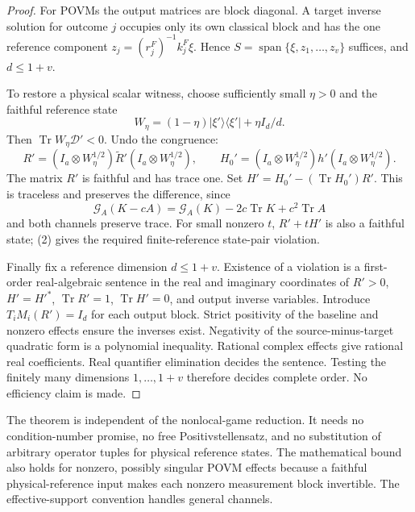 \documentclass[11pt]{article}
\newcommand{\Tr}{\operatorname{Tr}}
\begin{document}
\begin{proof}
For POVMs the output matrices are block diagonal. A target inverse solution for
outcome $j$ occupies only its own classical block and has the one reference
component $z_j=(r_j^F)^{-1}k_j^F\xi$. Hence
$S=\operatorname{span}\{\xi,z_1,\ldots,z_v\}$ suffices, and $d\le1+v$.

To restore a physical scalar witness, choose sufficiently small $\eta>0$ and
the faithful reference state
\[
 W_\eta=(1-\eta)|\xi'\rangle\langle\xi'|+\eta I_d/d.
\]
Then $\Tr W_\eta\mathcal D'<0$. Undo the congruence:
\[
 R'=(I_a\otimes W_\eta^{1/2})\widetilde R'(I_a\otimes W_\eta^{1/2}),\qquad
 H_0'=(I_a\otimes W_\eta^{1/2})h'(I_a\otimes W_\eta^{1/2}).
\]
The matrix $R'$ is faithful and has trace one. Set
$H'=H_0'-(\Tr H_0')R'$. This is traceless and preserves the difference, since
\[
 \mathcal G_A(K-cA)=\mathcal G_A(K)-2c\Tr K+c^2\Tr A
\]
and both channels preserve trace. For small nonzero $t$, $R'+tH'$ is also a
faithful state; (2) gives the required finite-reference state-pair violation.

Finally fix a reference dimension $d\le1+v$. Existence of a violation is a
first-order real-algebraic sentence in the real and imaginary coordinates of
$R'>0$, $H'=H'^*$, $\Tr R'=1$, $\Tr H'=0$, and output inverse variables.
Introduce $T_iM_i(R')=I_d$ for each output block. Strict positivity of the
baseline and nonzero effects ensure the inverses exist. Negativity of the
source-minus-target quadratic form is a polynomial inequality. Rational
complex effects give rational real coefficients. Real quantifier elimination
decides the sentence. Testing the finitely many dimensions $1,\ldots,1+v$
therefore decides complete order. No efficiency claim is made.
\end{proof}

The theorem is independent of the nonlocal-game reduction. It needs no
condition-number promise, no free Positivstellensatz, and no substitution of
arbitrary operator tuples for physical reference states. The mathematical bound
also holds for nonzero, possibly singular POVM effects because a faithful
physical-reference input makes each nonzero measurement block invertible.
The effective-support convention handles general channels.
\end{document}
